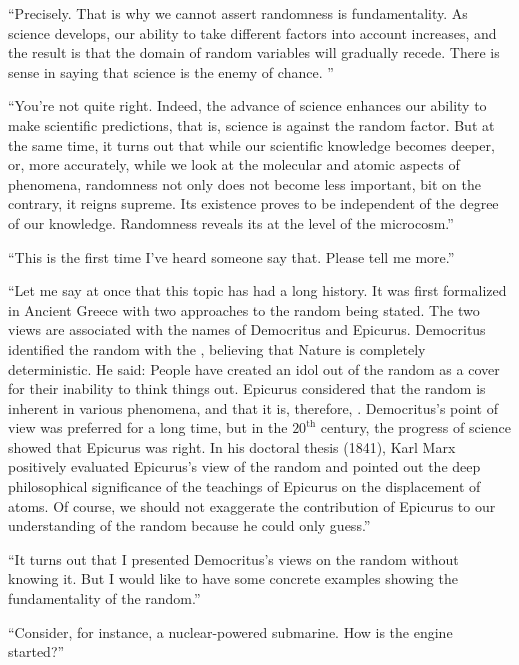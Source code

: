\begin{dialogue}
\rdr  ``Precisely. That is why we cannot assert randomness is
fundamentality. As science develops, our ability to take different
factors into account increases, and the result is that the domain of
random variables will gradually recede. There is sense in saying that
 science is the enemy of chance. ''  

\athr ``You're not quite right. Indeed, the advance of
  science enhances our ability to make scientific predictions, that
  is, science is against the random factor. But at the same time, it
  turns out that while our scientific knowledge becomes deeper, or,
  more accurately, while we look at the molecular and atomic aspects
  of phenomena, randomness not only does not become less important,
  bit on the contrary, it reigns supreme. Its existence proves to be
  independent of the degree of our knowledge. Randomness reveals its
   at the level of the microcosm.''

\rdr  ``This is the first time I've heard someone say
  that. Please tell me more.''

\athr  ``Let me say at once that this topic has had a long
  history. It was first formalized in Ancient Greece with two
  approaches to the random being stated. The two views are associated
  with the names of Democritus and Epicurus. Democritus identified the
  random with the , believing that Nature is completely
  deterministic. He said:  People have created an idol out of the
    random as a cover for their inability to think things out.
  Epicurus considered that the random is inherent in various
  phenomena, and that it is, therefore, . Democritus's
  point of view was preferred for a long time, but in the $20^{\text{th}}$ century, the progress of science showed that Epicurus was right. In his doctoral thesis  (1841), Karl Marx positively evaluated Epicurus's view of the random and pointed out the deep philosophical significance of the teachings of Epicurus on the    displacement of atoms. Of course, we should not exaggerate the contribution of Epicurus to our understanding of the random because he could only guess.''

\rdr  ``It turns out that I presented Democritus's views
  on the random without knowing it. But I would like to have some
  concrete examples showing the fundamentality of the random.''

\athr  ``Consider, for instance, a nuclear-powered
  submarine. How is the engine started?'' 


\end{dialogue}
